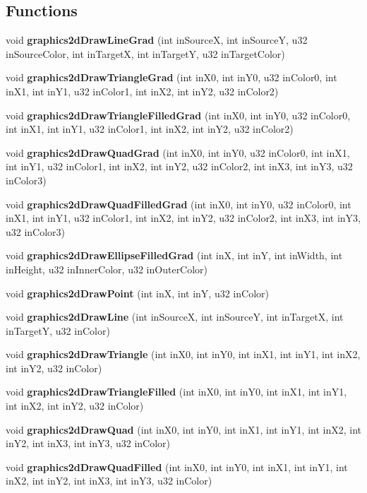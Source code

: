\subsection*{Functions}
\begin{CompactItemize}
\item 
void {\bf graphics2d\-Draw\-Line\-Grad} (int in\-Source\-X, int in\-Source\-Y, u32 in\-Source\-Color, int in\-Target\-X, int in\-Target\-Y, u32 in\-Target\-Color)
\item 
void {\bf graphics2d\-Draw\-Triangle\-Grad} (int in\-X0, int in\-Y0, u32 in\-Color0, int in\-X1, int in\-Y1, u32 in\-Color1, int in\-X2, int in\-Y2, u32 in\-Color2)
\item 
void {\bf graphics2d\-Draw\-Triangle\-Filled\-Grad} (int in\-X0, int in\-Y0, u32 in\-Color0, int in\-X1, int in\-Y1, u32 in\-Color1, int in\-X2, int in\-Y2, u32 in\-Color2)
\item 
void {\bf graphics2d\-Draw\-Quad\-Grad} (int in\-X0, int in\-Y0, u32 in\-Color0, int in\-X1, int in\-Y1, u32 in\-Color1, int in\-X2, int in\-Y2, u32 in\-Color2, int in\-X3, int in\-Y3, u32 in\-Color3)
\item 
void {\bf graphics2d\-Draw\-Quad\-Filled\-Grad} (int in\-X0, int in\-Y0, u32 in\-Color0, int in\-X1, int in\-Y1, u32 in\-Color1, int in\-X2, int in\-Y2, u32 in\-Color2, int in\-X3, int in\-Y3, u32 in\-Color3)
\item 
void {\bf graphics2d\-Draw\-Ellipse\-Filled\-Grad} (int in\-X, int in\-Y, int in\-Width, int in\-Height, u32 in\-Inner\-Color, u32 in\-Outer\-Color)
\item 
void {\bf graphics2d\-Draw\-Point} (int in\-X, int in\-Y, u32 in\-Color)
\item 
void {\bf graphics2d\-Draw\-Line} (int in\-Source\-X, int in\-Source\-Y, int in\-Target\-X, int in\-Target\-Y, u32 in\-Color)
\item 
void {\bf graphics2d\-Draw\-Triangle} (int in\-X0, int in\-Y0, int in\-X1, int in\-Y1, int in\-X2, int in\-Y2, u32 in\-Color)
\item 
void {\bf graphics2d\-Draw\-Triangle\-Filled} (int in\-X0, int in\-Y0, int in\-X1, int in\-Y1, int in\-X2, int in\-Y2, u32 in\-Color)
\item 
void {\bf graphics2d\-Draw\-Quad} (int in\-X0, int in\-Y0, int in\-X1, int in\-Y1, int in\-X2, int in\-Y2, int in\-X3, int in\-Y3, u32 in\-Color)
\item 
void {\bf graphics2d\-Draw\-Quad\-Filled} (int in\-X0, int in\-Y0, int in\-X1, int in\-Y1, int in\-X2, int in\-Y2, int in\-X3, int in\-Y3, u32 in\-Color)

\end{CompactItemize}
